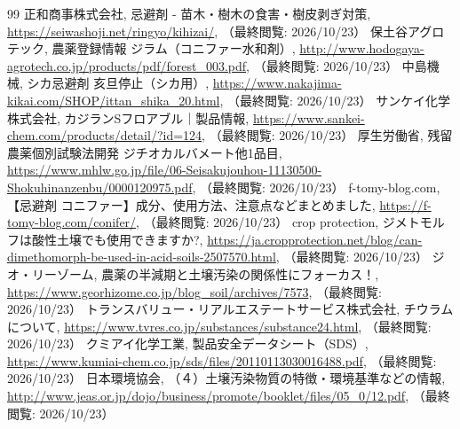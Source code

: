 \documentclass[a4paper, 11pt]{jsarticle}
\begin{document}
\begin{thebibliography}{99}
     正和商事株式会社, 忌避剤 - 苗木・樹木の食害・樹皮剥ぎ対策, \url{https://seiwashoji.net/ringyo/kihizai/}, （最終閲覧: 2026/10/23）
     保土谷アグロテック, 農薬登録情報 ジラム（コニファー水和剤）, \url{http://www.hodogaya-agrotech.co.jp/products/pdf/forest_003.pdf}, （最終閲覧: 2026/10/23）
     中島機械, シカ忌避剤 亥旦停止（シカ用）, \url{https://www.nakajima-kikai.com/SHOP/ittan_shika_20.html}, （最終閲覧: 2026/10/23）
     サンケイ化学株式会社, カジランSフロアブル｜製品情報, \url{https://www.sankei-chem.com/products/detail/?id=124}, （最終閲覧: 2026/10/23）
     厚生労働省, 残留農薬個別試験法開発 ジチオカルバメート他1品目, \url{https://www.mhlw.go.jp/file/06-Seisakujouhou-11130500-Shokuhinanzenbu/0000120975.pdf}, （最終閲覧: 2026/10/23）
     f-tomy-blog.com, 【忌避剤 コニファー】成分、使用方法、注意点などまとめました, \url{https://f-tomy-blog.com/conifer/}, （最終閲覧: 2026/10/23）
     crop protection, ジメトモルフは酸性土壌でも使用できますか?, \url{https://ja.cropprotection.net/blog/can-dimethomorph-be-used-in-acid-soils-2507570.html}, （最終閲覧: 2026/10/23）
     ジオ・リーゾーム, 農薬の半減期と土壌汚染の関係性にフォーカス！, \url{https://www.georhizome.co.jp/blog_soil/archives/7573}, （最終閲覧: 2026/10/23）
     トランスバリュー・リアルエステートサービス株式会社, チウラムについて, \url{https://www.tvres.co.jp/substances/substance24.html}, （最終閲覧: 2026/10/23）
     クミアイ化学工業, 製品安全データシート（SDS）, \url{https://www.kumiai-chem.co.jp/sds/files/20110113030016488.pdf}, （最終閲覧: 2026/10/23）
     日本環境協会, （４）土壌汚染物質の特徴・環境基準などの情報, \url{http://www.jeas.or.jp/dojo/business/promote/booklet/files/05_0/12.pdf}, （最終閲覧: 2026/10/23）
\end{thebibliography}
\end{document}
